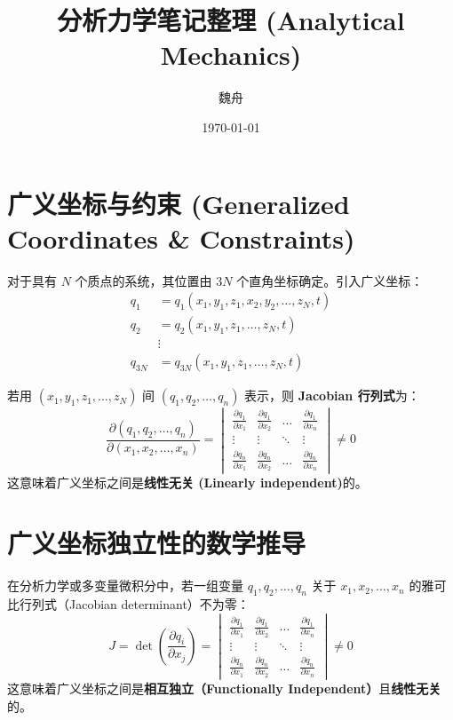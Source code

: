 \documentclass[11pt,a4paper]{article}
\title{分析力学笔记整理 (Analytical Mechanics)}
\author{魏舟}
\date{\today}
\begin{document}
\maketitle
\newpage
\tableofcontents
\newpage
\section{广义坐标与约束 (Generalized Coordinates \& Constraints)}

对于具有 $N$ 个质点的系统，其位置由 $3N$ 个直角坐标确定。引入广义坐标：
\begin{align*}
    q_1 &= q_1(x_1, y_1, z_1, x_2, y_2, \dots, z_N, t) \\
    q_2 &= q_2(x_1, y_1, z_1, \dots, z_N, t) \\
    &\vdots \\
    q_{3N} &= q_{3N}(x_1, y_1, z_1, \dots, z_N, t)
\end{align*}

若用 $(x_1, y_1, z_1, \dots, z_N)$ 间 $(q_1, q_2, \dots, q_n)$ 表示，则 \textbf{Jacobian 行列式}为：
$$ \frac{\partial(q_1, q_2, \dots, q_n)}{\partial(x_1, x_2, \dots, x_n)} = 
\begin{vmatrix} 
\frac{\partial q_1}{\partial x_1} & \frac{\partial q_1}{\partial x_2} & \dots & \frac{\partial q_1}{\partial x_n} \\
\vdots & \vdots & \ddots & \vdots \\
\frac{\partial q_n}{\partial x_1} & \frac{\partial q_n}{\partial x_2} & \dots & \frac{\partial q_n}{\partial x_n} 
\end{vmatrix} \neq 0 $$
这意味着广义坐标之间是\textbf{线性无关 (Linearly independent)}的。

\section*{广义坐标独立性的数学推导}

在分析力学或多变量微积分中，若一组变量 $q_1, q_2, \dots, q_n$ 关于 $x_1, x_2, \dots, x_n$ 的雅可比行列式（Jacobian determinant）不为零：
\[
J = \det\left(\frac{\partial q_i}{\partial x_j}\right) = 
\begin{vmatrix} 
\frac{\partial q_1}{\partial x_1} & \frac{\partial q_1}{\partial x_2} & \dots & \frac{\partial q_1}{\partial x_n} \\
\vdots & \vdots & \ddots & \vdots \\
\frac{\partial q_n}{\partial x_1} & \frac{\partial q_n}{\partial x_2} & \dots & \frac{\partial q_n}{\partial x_n} 
\end{vmatrix} \neq 0 
\]
这意味着广义坐标之间是\textbf{相互独立（Functionally Independent）}且\textbf{线性无关}的。
\end{document}
